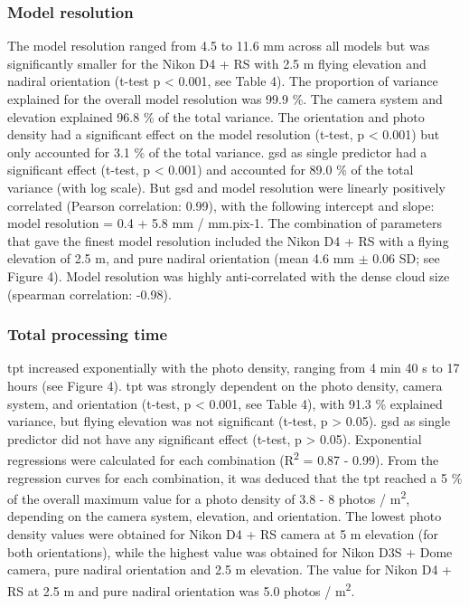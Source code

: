 \subsubsection{Model resolution}\label{chapitre1_3.1.3}
The model resolution ranged from 4.5 to 11.6 mm across all models but was significantly smaller for the Nikon D4 + RS with 2.5 m flying elevation and nadiral orientation (t-test p < 0.001, see Table 4). The proportion of variance explained for the overall model resolution was 99.9 \%. The camera system and elevation explained 96.8 \% of the total variance. The orientation and photo density had a significant effect on the model resolution (t-test, p < 0.001) but only accounted for 3.1 \% of the total variance. \acrshort{gsd} as single predictor had a significant effect (t-test, p < 0.001) and accounted for 89.0 \% of the total variance (with log scale). But \acrshort{gsd} and model resolution were linearly positively correlated (Pearson correlation: 0.99), with the following intercept and slope: model resolution = 0.4 + 5.8 mm / mm.pix-1. The combination of parameters that gave the finest model resolution included the Nikon D4 + RS with a flying elevation of 2.5 m, and pure nadiral orientation (mean 4.6 mm $\pm$ 0.06 SD; see Figure 4). Model resolution was highly anti-correlated with the dense cloud size (spearman correlation: -0.98).

\subsubsection{Total processing time}\label{chapitre1_3.1.4}
\acrshort{tpt} increased exponentially with the photo density, ranging from 4 min 40 s to 17 hours (see Figure 4). \acrshort{tpt} was strongly dependent on the photo density, camera system, and orientation (t-test, p < 0.001, see Table 4), with 91.3 \% explained variance, but flying elevation was not significant (t-test, p > 0.05). \acrshort{gsd} as single predictor did not have any significant effect (t-test, p > 0.05).
\medskip
Exponential regressions were calculated for each combination (R\textsuperscript{2} = 0.87 - 0.99). From the regression curves for each combination, it was deduced that the \acrshort{tpt} reached a 5 \% of the overall maximum value for a photo density of 3.8 - 8 photos / m\textsuperscript{2}, depending on the camera system, elevation, and orientation. The lowest photo density values were obtained for Nikon D4 + RS camera at 5 m elevation (for both orientations), while the highest value was obtained for Nikon D3S + Dome camera, pure nadiral orientation and 2.5 m elevation. The value for Nikon D4 + RS at 2.5 m and pure nadiral orientation was 5.0 photos / m\textsuperscript{2}.

